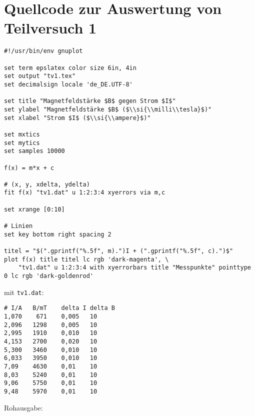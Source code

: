 \section{\gnuplot{} Quellcode zur Auswertung von Teilversuch 1}
    \label{appdx:tv1}
    {  
        \renewcommand{\fcolorbox}[4][]{#4}
        \begin{verbatim}
#!/usr/bin/env gnuplot

set term epslatex color size 6in, 4in
set output "tv1.tex"
set decimalsign locale 'de_DE.UTF-8'

set title "Magnetfeldstärke $B$ gegen Strom $I$"
set ylabel "Magnetfeldstärke $B$ ($\\si{\\milli\\tesla}$)"
set xlabel "Strom $I$ ($\\si{\\ampere}$)"

set mxtics
set mytics
set samples 10000

f(x) = m*x + c

# (x, y, xdelta, ydelta)
fit f(x) "tv1.dat" u 1:2:3:4 xyerrors via m,c

set xrange [0:10]

# Linien
set key bottom right spacing 2

titel = "$(".gprintf("%.5f", m).")I + (".gprintf("%.5f", c).")$"
plot f(x) title titel lc rgb 'dark-magenta', \
    "tv1.dat" u 1:2:3:4 with xyerrorbars title "Messpunkte" pointtype 0 lc rgb 'dark-goldenrod'

        \end{verbatim}
    }
    mit \texttt{tv1.dat}:
    \begin{multicols}{2}
        \begin{verbatim}
# I/A   B/mT    delta I delta B
1,070    671    0,005   10
2,096   1298    0,005   10
2,995   1910    0,010   10
4,153   2700    0,020   10
5,300   3460    0,010   10
6,033   3950    0,010   10
7,09    4630    0,01    10
8,03    5240    0,01    10
9,06    5750    0,01    10
9,48    5970    0,01    10
        \end{verbatim}
    \end{multicols}
    \vspace{-\baselineskip}
    Rohausgabe:
